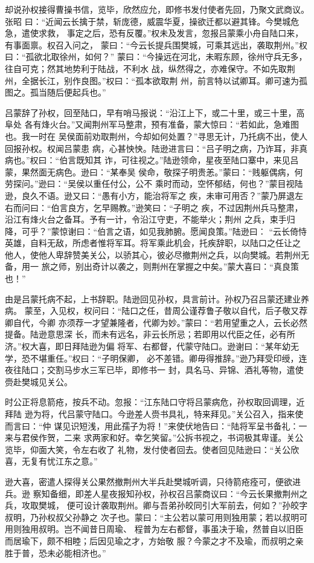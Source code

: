 却说孙权接得曹操书信，览毕，欣然应允，即修书发付使者先回，乃聚文武商议。张昭
曰：“近闻云长擒于禁，斩庞德，威震华夏，操欲迁都以避其锋。今樊城危急，遣使求救，
事定之后，恐有反覆。”权未及发言，忽报吕蒙乘小舟自陆口来，有事面禀。权召入问之，
蒙曰：“今云长提兵围樊城，可乘其远出，袭取荆州。”权曰：“孤欲北取徐州，如何？”
蒙曰：“今操远在河北，未暇东顾，徐州守兵无多，往自可克；然其地势利于陆战，不利水
战，纵然得之，亦难保守。不如先取荆州，全据长江，别作良图。”权曰：“孤本欲取荆
州，前言特以试卿耳。卿可速为孤图之。孤当随后便起兵也。”

吕蒙辞了孙权，回至陆口，早有哨马报说：“沿江上下，或二十里，或三十里，高阜处
各有烽火台。”又闻荆州军马整肃，预有准备，蒙大惊曰：“若如此，急难图也。我一时在
吴侯面前劝取荆州，今却如何处置？”寻思无计，乃托病不出，使人回报孙权。权闻吕蒙患
病，心甚怏怏。陆逊进言曰：“吕子明之病，乃诈耳，非真病也。”权曰：“伯言既知其
诈，可往视之。”陆逊领命，星夜至陆口寨中，来见吕蒙，果然面无病色。逊曰：“某奉吴
侯命，敬探子明贵恙。”蒙曰：“贱躯偶病，何劳探问。”逊曰：“吴侯以重任付公，公不
乘时而动，空怀郁结，何也？”蒙目视陆逊，良久不语。逊又曰：“愚有小方，能治将军之
疾，未审可用否？”蒙乃屏退左右而问曰：“伯言良方，乞早赐教。”逊笑曰：“子明之
疾，不过因荆州兵马整肃，沿江有烽火台之备耳。予有一计，令沿江守吏，不能举火；荆州
之兵，束手归降，可乎？”蒙惊谢曰：“伯言之语，如见我肺腑。愿闻良策。”陆逊曰：
“云长倚恃英雄，自料无敌，所虑者惟将军耳。将军乘此机会，托疾辞职，以陆口之任让之
他人，使他人卑辞赞美关公，以骄其心，彼必尽撤荆州之兵，以向樊城。若荆州无备，用一
旅之师，别出奇计以袭之，则荆州在掌握之中矣。”蒙大喜曰：“真良策也！”

由是吕蒙托病不起，上书辞职。陆逊回见孙权，具言前计。孙权乃召吕蒙还建业养病。
蒙至，入见权，权问曰：“陆口之任，昔周公谨荐鲁子敬以自代，后子敬又荐卿自代，今卿
亦须荐一才望兼隆者，代卿为妙。”蒙曰：“若用望重之人，云长必然提备。陆逊意思深
长，而未有远名，非云长所忌；若即用以代臣之任，必有所济。”权大喜，即日拜陆逊为偏
将军、右都督，代蒙守陆口。逊谢曰：“某年幼无学，恐不堪重任。”权曰：“子明保卿，
必不差错。卿毋得推辞。”逊乃拜受印绶，连夜往陆口；交割马步水三军已毕，即修书一
封，具名马、异锦、酒礼等物，遣使赍赴樊城见关公。

时公正将息箭疮，按兵不动。忽报：“江东陆口守将吕蒙病危，孙权取回调理，近拜陆
逊为将，代吕蒙守陆口。今逊差人赍书具礼，特来拜见。”关公召入，指来使而言曰：“仲
谋见识短浅，用此孺子为将！”来使伏地告曰：“陆将军呈书备礼：一来与君侯作贺，二来
求两家和好。幸乞笑留。”公拆书视之，书词极其卑谨。关公览毕，仰面大笑，令左右收了
礼物，发付使者回去。使者回见陆逊曰：“关公欣喜，无复有忧江东之意。”

逊大喜，密遣人探得关公果然撤荆州大半兵赴樊城听调，只待箭疮痊可，便欲进兵。逊
察知备细，即差人星夜报知孙权，孙权召吕蒙商议曰：“今云长果撤荆州之兵，攻取樊城，
便可设计袭取荆州。卿与吾弟孙皎同引大军前去，何如？”孙皎字叔明，乃孙权叔父孙静之
次子也。蒙曰：“主公若以蒙可用则独用蒙；若以叔明可用则独用叔明。岂不闻昔日周瑜、
程普为左右都督，事虽决于瑜，然普自以旧臣而居瑜下，颇不相睦；后因见瑜之才，方始敬
服？今蒙之才不及瑜，而叔明之亲胜于普，恐未必能相济也。”

